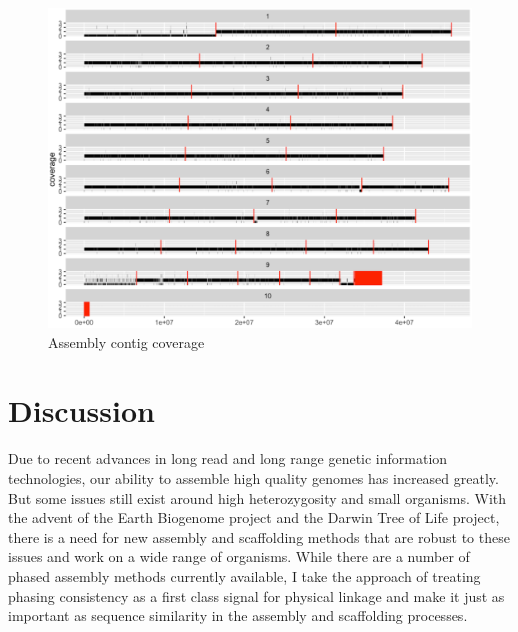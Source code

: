 {\begin{figure}[htbp!]
\caption{Assembly contig coverage}
\label{figure:contigcoverage}
\begin{centering}
\includegraphics[width=\textwidth]{assemblycontigcoverage.png}
\end{centering}
\end{figure}



\section{Discussion}

\par{
Due to recent advances in long read and long range genetic information technologies, our ability to assemble high quality genomes has increased greatly. But some issues still exist around high heterozygosity and small organisms. With the advent of the Earth Biogenome project and the Darwin Tree of Life project, there is a need for new assembly and scaffolding methods that are robust to these issues and work on a wide range of organisms. While there are a number of phased assembly methods currently available, I take the approach of treating phasing consistency as a first class signal for physical linkage and make it just as important as sequence similarity in the assembly and scaffolding processes.
} 

}
